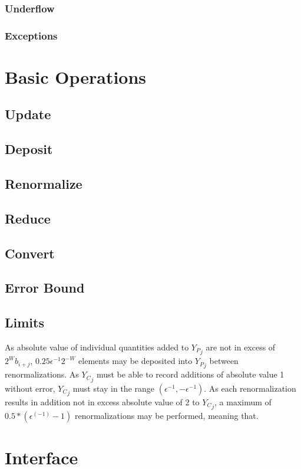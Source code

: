 \documentclass[12pt]{article}
\theoremstyle{plain}
\begin{document}
    \subsubsection{Underflow}
      
    \subsubsection{Exceptions}
\section{Basic Operations}
  \subsection{Update}
  \subsection{Deposit}
  \subsection{Renormalize}
  \subsection{Reduce}
  \subsection{Convert}
  \subsection{Error Bound}
  \subsection{Limits}
    \label{sec:limits}
    As absolute value of individual quantities added to ${Y_P}_j$ are not in excess of $2^W b_{i + j}$, $0.25\epsilon^{-1}2^{-W}$ elements may be deposited into ${Y_P}_j$ between renormalizations. As ${Y_C}_j$ must be able to record additions of absolute value 1 without error, ${Y_C}_j$ must stay in the range $(\epsilon^{-1}, -\epsilon^{-1})$. As each renormalization results in addition not in excess absolute value of 2 to ${Y_C}_j$, a maximum of $0.5 * (\epsilon^(-1) - 1)$ renormalizations may be performed, meaning that.
\section{Interface}
\end{document}
